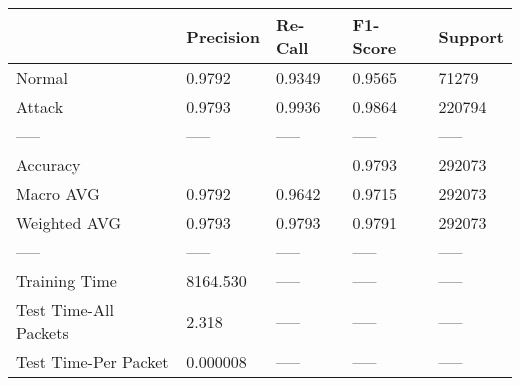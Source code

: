 \begin{tabular}{lllll}
\toprule
{} & Precision & Re-Call & F1-Score & Support \\
\midrule
Normal                &    0.9792 &  0.9349 &   0.9565 &   71279 \\
Attack                &    0.9793 &  0.9936 &   0.9864 &  220794 \\
-----                 &     ----- &   ----- &    ----- &   ----- \\
Accuracy              &           &         &   0.9793 &  292073 \\
Macro AVG             &    0.9792 &  0.9642 &   0.9715 &  292073 \\
Weighted AVG          &    0.9793 &  0.9793 &   0.9791 &  292073 \\
-----                 &     ----- &   ----- &    ----- &   ----- \\
Training Time         &  8164.530 &   ----- &    ----- &   ----- \\
Test Time-All Packets &     2.318 &   ----- &    ----- &   ----- \\
Test Time-Per Packet  &  0.000008 &   ----- &    ----- &   ----- \\
\bottomrule
\end{tabular}
